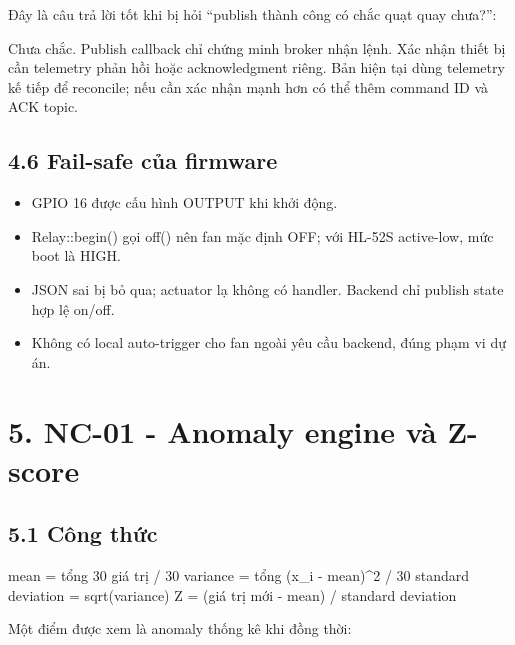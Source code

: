 \documentclass[11pt,oneside,openany]{book}
\renewcommand{\texttt}[1]{{\ttfamily\small #1}}
\newenvironment{Shaded}{\begin{snugshade}}{\end{snugshade}}
\newcommand{\NormalTok}[1]{\textcolor[rgb]{0.81,0.81,0.76}{#1}}
\renewenvironment{Shaded}{%
  \def\FrameCommand{\fboxsep=8pt\colorbox{shadecolor}}%
  \MakeFramed{\advance\hsize-\width\FrameRestore}%
}{\endMakeFramed}
\renewenvironment{quote}{%
  \def\FrameCommand{\hspace{1pt}{\color{Accent}\vrule width 3pt}\hspace{9pt}}%
  \MakeFramed{\advance\hsize-\width\FrameRestore}%
  \color{MutedText}\itshape
}{\endMakeFramed}
\providecommand{\tightlist}{\setlength{\itemsep}{1pt}\setlength{\parskip}{0pt}}
\begin{document}
Đây là câu trả lời tốt khi bị hỏi ``publish thành công có chắc quạt quay
chưa?'':

\begin{quote}
Chưa chắc. Publish callback chỉ chứng minh broker nhận lệnh. Xác nhận
thiết bị cần telemetry phản hồi hoặc acknowledgment riêng. Bản hiện tại
dùng telemetry kế tiếp để reconcile; nếu cần xác nhận mạnh hơn có thể
thêm command ID và ACK topic.
\end{quote}

\subsection{4.6 Fail-safe của
firmware}\label{46-fail-safe-cux1ee7a-firmware}

\begin{itemize}
\tightlist
\item
  GPIO 16 được cấu hình OUTPUT khi khởi động.
\item
  \texttt{Relay::begin()} gọi \texttt{off()} nên fan mặc định OFF; với
  HL-52S active-low, mức boot là HIGH.
\item
  JSON sai bị bỏ qua; actuator lạ không có handler. Backend chỉ publish
  state hợp lệ \texttt{on}/\texttt{off}.
\item
  Không có local auto-trigger cho fan ngoài yêu cầu backend, đúng phạm
  vi dự án.
\end{itemize}

\section{5. NC-01 - Anomaly engine và
Z-score}\label{5-nc-01---anomaly-engine-vuxe0-z-score}

\subsection{5.1 Công thức}\label{51-cuxf4ng-thux1ee9c}

\begin{Shaded}
\begin{Highlighting}[]
\NormalTok{mean = tổng 30 giá trị / 30}
\NormalTok{variance = tổng (x\_i {-} mean)\^{}2 / 30}
\NormalTok{standard deviation = sqrt(variance)}
\NormalTok{Z = (giá trị mới {-} mean) / standard deviation}
\end{Highlighting}
\end{Shaded}

Một điểm được xem là anomaly thống kê khi đồng thời:
\end{document}
